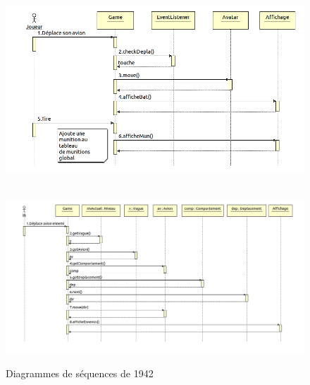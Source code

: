 \begin{figure}[h]
 \centering
 \includegraphics[height=8cm]{../umls/UML_images/Bat42/sequence} \hfill
 \includegraphics[width=\textwidth]{../umls/UML_images/Bat42/sequenceIA} \hfill
 \caption{Diagrammes de séquences de 1942}
\end{figure}

\clearpage

